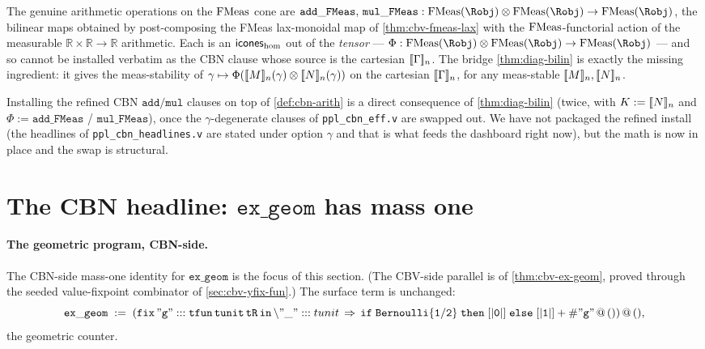 \begin{definition}\label{def:cbn-arith}
\rocqok
{}\rocqok
{}
The genuine arithmetic operations on the $\mathrm{FMeas}$ cone are
$\mathtt{add\_FMeas},\,\mathtt{mul\_FMeas} :
\FMeas(\Robj) \otimes \FMeas(\Robj) \to \FMeas(\Robj)$, the bilinear
maps obtained by post-composing the FMeas lax-monoidal map
 of
\autoref{thm:cbv-fmeas-lax} with the $\mathrm{FMeas}$-functorial action of the
measurable $\mathbb{R}\times\mathbb{R}\to\mathbb{R}$ arithmetic. Each
is an $\mathsf{icones}_{\mathrm{hom}}$ out of the \emph{tensor} ---
$\Phi : \FMeas(\Robj) \otimes \FMeas(\Robj) \to \FMeas(\Robj)$ ---
and so cannot be installed verbatim as the CBN clause whose source is
the cartesian $[\![ \Gamma ]\!]_n$. The bridge
\autoref{thm:diag-bilin} is exactly the missing ingredient: it gives
the meas-stability of $\gamma \mapsto \Phi([\![ M ]\!]_n(\gamma) \otimes
[\![ N ]\!]_n(\gamma))$ on the cartesian $[\![ \Gamma ]\!]_n$, for any
meas-stable $[\![ M ]\!]_n, [\![ N ]\!]_n$.
\end{definition}

\begin{remark}\label{rem:cbn-arith-install}
Installing the refined CBN $\mathtt{add}/\mathtt{mul}$ clauses on top of
\autoref{def:cbn-arith} is a direct consequence of
\autoref{thm:diag-bilin} (twice, with $K := [\![ N ]\!]_n$ and
$\Phi := \mathtt{add\_FMeas}$ / $\mathtt{mul\_FMeas}$), once the
$\gamma$-degenerate clauses of \texttt{ppl\_cbn\_eff.v} are swapped
out. We have not packaged the refined install (the headlines of
\texttt{ppl\_cbn\_headlines.v} are stated under option $\gamma$ and
that is what feeds the dashboard right now), but the math is now in
place and the swap is structural.
\end{remark}

\section{The CBN headline:
\texorpdfstring{$\mathtt{ex\_geom}$}{ex\_geom} has mass one}%
\label{sec:cbn-geom}

\paragraph{The geometric program, CBN-side.}
The CBN-side mass-one identity for $\mathtt{ex\_geom}$ is the focus
of this section. (The CBV-side parallel is
 of
\autoref{thm:cbv-ex-geom}, proved through the seeded value-fixpoint
combinator  of
\autoref{sec:cbv-yfix-fun}.) The surface term is
unchanged:
\[
  \mathtt{ex\_geom}
  \;:=\;
  (\mathtt{fix\,"g":::tfun\,tunit\,tR\,in}\,
   \backslash"\_":::tunit \,\Rightarrow\,
   \mathtt{if\;Bernoulli\{1/2\}\;then\;[|0|]\;else\;[|1|] + \#"g"\,@\,()})\,@\,(),
\]
the geometric counter.

